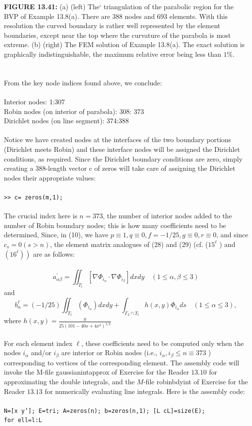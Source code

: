 \documentclass[../main.tex]{subfiles}
\begin{document}
\textbf{FIGURE 13.41:} (a) (left) The` triangulation of the parabolic region for the BVP of Example 13.8(a). There are 388 nodes and 693 elements. With this resolution the curved boundary is rather well represented by the element boundaries, except near the top where the curvature of the parabola is most extreme. (b) (right) The FEM solution of Example 13.8(a). The exact solution is graphically indistinguishable, the maximum relative error being less than $1 \%$.
\\
\\
\\
From the key node indices found above, we conclude: 
\\
\\
Interior nodes: 1:307 \\
Robin nodes (on interior of parabola): 308: 373\\ 
Dirichlet nodes (on line segment): 374:388\\
\\
Notice we have created nodes at the interfaces of the two boundary portions 
(Dirichlet meets Robin) and these interface nodes will be assigned the Dirichlet 
conditions, as required. Since the Dirichlet boundary conditions are zero, simply 
creating a 388-length vector c of zeros will take care of assigning the Dirichlet 
nodes their appropriate values:
\\
\\
\texttt{>> c= zeros(m,1); }
\\
\\
The crucial index here is $n=373$, the number of interior nodes added to the number of Robin boundary nodes; this is how many coefficients need to be determined, Since, in (10), we have $p \equiv 1, q \equiv 0, f=-1 / 25, g \equiv 0, r \equiv 0$, and since $c_{s}=0(s>n)$, the element matrix analogues of (28) and (29) (cf. ($15^{\ell}$ ) and $\left.\left(16^{\ell}\right)\right)$ are as follows:
\\
\\
$$
a_{\alpha \beta}^{\prime}=\iint_{T_{l}}\left[\nabla \Phi_{i_{\alpha}} \cdot \nabla \Phi_{i_{\beta}}\right] d x d y \quad(1 \leq \alpha, \beta \leq 3)
$$
and
$$
b_{\alpha}^{\ell}=(-1 / 25) \iint_{T_{t}}\left(\Phi_{i_{\alpha}}\right) d x d y+\int_{\Gamma_{2} \cap T_{t}} h(x, y) \Phi_{i_{\alpha}} d s \quad(1 \leq \alpha \leq 3),
$$
where $h(x, y)=\frac{y}{25\left(101-40 x+4 x^{2}\right)^{1 / 2}}$
\\
\\
For each element index $\ell$, these coefficients need to be computed only when the nodes $i_{\alpha}$ and/or $i_{\beta}$ are interior or Robin nodes (i.e., $i_{\alpha}, i_{\beta} \leq n \equiv 373$ ) corresponding to vertices of the corresponding element. The assembly code will invoke the M-file gaussianintapprox of Exercise for the Reader $13.10$ for approximating the double integrals, and the $M$-file robinbdyint of Exercise for the Reader $13.13$ for numerically evaluating line integrals. Here is the assembly code:
\\
\\
\texttt{N=[x y']; E=tri; A=zeros(n); b=zeros(n,1); [L cL]=size(E); }\\
\texttt{for ell=l:L }
\end{document}
